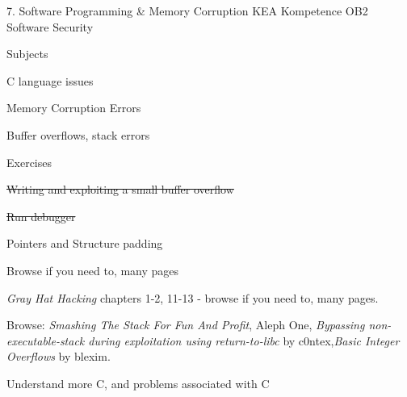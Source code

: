 \documentclass[Screen16to9,17pt]{foils}
\begin{document}
\mytitlepage
{7. Software Programming \& Memory Corruption}
{KEA Kompetence OB2 Software Security}


\begin{list1}
\item Subjects
\begin{list2}
\item C language issues
\item Memory Corruption Errors
\item Buffer overflows, stack errors
\end{list2}
\item Exercises
\begin{list2}
\item \sout{Writing and exploiting a small buffer overflow}
\item \sout{Run debugger}
\item Pointers and Structure padding
\end{list2}
\end{list1}


\centerline{Browse if you need to, many pages}

\begin{list1}
\item \emph{Gray Hat Hacking} chapters 1-2, 11-13 - browse if you need to, many pages.
\item Browse: \emph{Smashing The Stack For Fun And Profit}, Aleph One, \emph{Bypassing non-executable-stack during exploitation using return-to-libc} by c0ntex,\emph{Basic Integer Overflows} by blexim.


\end{list1}



\begin{list1}
\item Understand more C, and problems associated with C
\end{list1}


\end{document}
